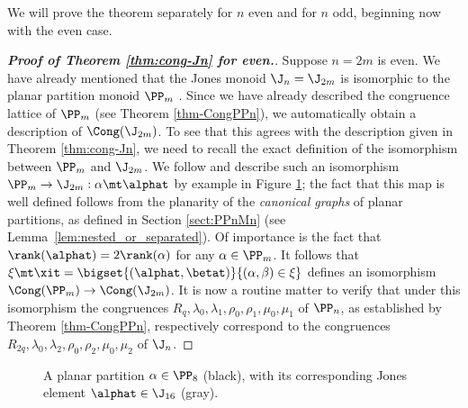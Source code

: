 We will prove the theorem separately for $n$ even and for $n$ odd, beginning now with the even case.




\begin{proof}[{\bf Proof of Theorem \ref{thm:cong-Jn} for  even.}]
Suppose $n=2m$ is even.  We have already mentioned that the Jones monoid $\J_n=\J_{2m}$ is isomorphic to the planar partition monoid $\PP_m$ \cite{HR2005,Jones1994_2}.
%
Since we have already described the congruence lattice of $\PP_m$ (see Theorem \ref{thm-CongPPn}), we automatically obtain a description of $\Cong(\J_{2m})$.  To see that this agrees with the description given in Theorem \ref{thm:cong-Jn}, we need to recall the exact definition of the isomorphism between $\PP_m$ and $\J_{2m}$.
We follow \cite[p873]{HR2005} and describe such an isomorphism $\PP_m\to\J_{2m}:\alpha\mt\alphat$ by example in Figure \ref{fig:PmJ2m}; the fact that this map is well defined follows from the planarity of the \emph{canonical graphs} of planar partitions, as defined in Section \ref{sect:PPnMn} (see Lemma~\ref{lem:nested_or_separated}).  Of importance is the fact that $\rank(\alphat)=2\rank(\alpha)$ for any $\alpha\in\PP_m$.
%
 It follows that $\xi\mt\xit=\bigset{(\alphat,\betat)}{(\alpha,\beta)\in\xi}$ defines an isomorphism $\Cong(\PP_m)\to\Cong(\J_{2m})$.
It is now a routine matter to verify that under this isomorphism the congruences $R_q,\lambda_0,\lambda_1,\rho_0,\rho_1,\mu_0,\mu_1$ of $\PP_n$, as established by Theorem \ref{thm-CongPPn}, respectively correspond to the congruences
$R_{2q},\lambda_0,\lambda_2,\rho_0,\rho_2,\mu_0,\mu_2$ of $\J_n$.
\end{proof}



\begin{figure}[ht]
\begin{center}
\end{center}
\vspace{-5mm}
\caption{A planar partition $\alpha\in\PP_8$ (black), with its corresponding Jones element $\alphat\in\J_{16}$ (gray).}
\label{fig:PmJ2m}
\end{figure}


